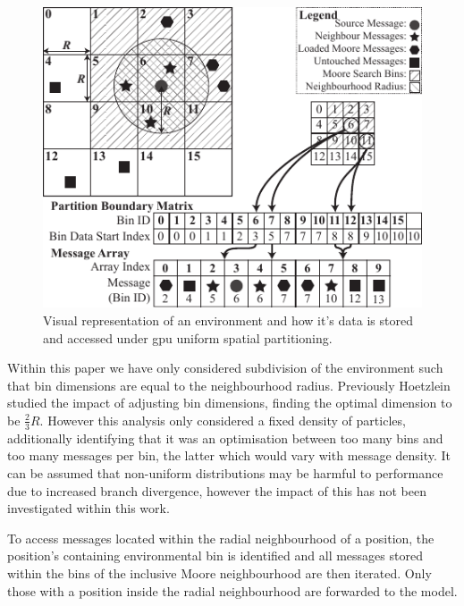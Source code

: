\begin{figure}[!t]
\centering
\includegraphics[width=\linewidth]{../resources/usp/usp.pdf}
\caption{\label{fig:uniform-spatial-partitioning}%
Visual representation of an environment and how it's data is stored and accessed under \gls{gpu} uniform spatial partitioning.
}
\end{figure}

Within this paper we have only considered subdivision of the environment such that bin dimensions are equal to the neighbourhood radius. Previously Hoetzlein studied the impact of adjusting bin dimensions, finding the optimal dimension to be $\frac{2}{3}R$\cite{Hoe14}. However this analysis only considered a fixed density of particles, additionally identifying that it was an optimisation between too many bins and too many messages per bin, the latter which would vary with message density.
It can be assumed that non-uniform distributions may be harmful to performance due to increased branch divergence, however the impact of this has not been investigated within this work.

To access messages located within the radial neighbourhood of a position, the position's containing environmental bin is identified and all messages stored within the bins of the inclusive Moore neighbourhood are then iterated. Only those with a position inside the radial neighbourhood are forwarded to the model.


